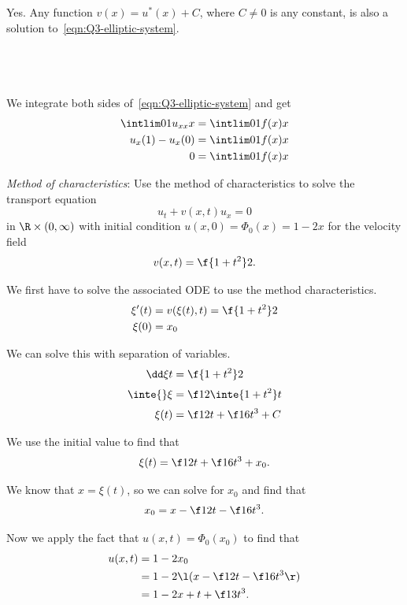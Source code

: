 \documentclass[a4paper]{article}
\begin{document}
Yes. Any function $v(x) = u^*(x) + C$, where $C \ne 0$ is any constant, is also a solution to~\eqref{eqn:Q3-elliptic-system}.

\subsection{~} %

We integrate both sides of~\eqref{eqn:Q3-elliptic-system} and get \begin{align*}
\intlim 01 {u_{xx}} x &= \intlim 01 {f(x)} x \\
u_x(1) - u_x(0) &= \intlim 01 {f(x)} x \\
0 &= \intlim 01 {f(x)} x
\end{align*}



\begin{questionbody}
\textit{Method of characteristics}: Use the method of characteristics to solve the transport equation \[
u_t + v(x, t) u_x = 0
\] in $\R \times (0, \infty)$ with initial condition $u(x, 0) = \Phi_0(x) = 1 - 2x$ for the velocity field \[
v(x, t) = \f{1 + t^2}2.
\]
\end{questionbody}

We first have to solve the associated ODE to use the method characteristics.
\begin{align*}
\xi'(t) &= v(\xi(t), t) = \f{1 + t^2}2 \\
\xi(0) &= x_0
\end{align*}

We can solve this with separation of variables.
\begin{align*}
\dd \xi t &= \f{1 + t^2}2 \\[0.5ex]
\inte {} \xi &= \f12 \inte {1 + t^2} t \\[0.5ex]
\xi(t) &= \f12 t + \f16 t^3 + C
\end{align*}

We use the initial value to find that \[ \xi(t) = \f12 t + \f16 t^3 + x_0. \]


We know that $x = \xi(t)$, so we can solve for $x_0$ and find that \[ x_0 = x - \f12 t - \f16 t^3. \]

Now we apply the fact that $u(x, t) = \Phi_0(x_0)$ to find that
\begin{align*}
u(x, t) &= 1 - 2x_0 \\
&= 1 - 2 \l( x - \f12 t - \f16 t^3 \r) \\
&= 1 - 2x + t + \f13 t^3.
\end{align*}
\end{document}
